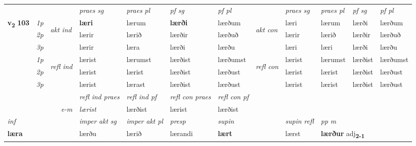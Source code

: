 \begin{longtable}[l]{X>{\footnotesize\itshape}llXXXXlXXXX}
 & &   & \textit{praes sg}  & \textit{praes pl}    & \textit{ pf sg} & \textit{pf pl} & & \textit{praes sg}  & \textit{praes pl}    & \textit{pf sg} & \textit{pf pl }  \\ \cmidrule{4-7} \cmidrule{9-12}
 \multirow{2}{*}{{{\textbf{v{\textsubscript{2}}} \Large{\textbf{103}}}}}  & 1p & \multirow{3}{*}{\begin{turn}{90}\textit{akt ind}\end{turn}} & \textbf{læri} & lærum & \textbf{lærði} & lærðum & \multirow{3}{*}{\begin{turn}{90}\textit{akt con}\end{turn}} &læri & lærum & lærði & lærðum\\*
 & 2p &  &  lærir  & lærið & lærðir & lærðuð & & lærir & lærið & lærðir & lærðuð \\*
 & 3p &  & lærir & læra & lærði & lærðu & & læri & læri& lærði & lærðu \\*
\cmidrule{4-7} \cmidrule{9-12}
 & 1p & \multirow{3}{*}{\begin{turn}{90}\textit{refl ind}\end{turn}}  & lærist & lærumst & lærðist & lærðumst & \multirow{3}{*}{\begin{turn}{90}\textit{refl con}\end{turn}}  &lærist & lærumst & lærðist & lærðumst \\*
 & 2p &  & lærist & lærist & lærðist & lærðust & &lærist & lærist & lærðist & lærðust \\*
 & 3p  & & lærist & lærast & lærðist & lærðust & & lærist & lærist& lærðist & lærðust \\*
\cmidrule{4-7} \cmidrule{9-12}

 & && \textit{refl ind praes} & \textit{refl ind pf} & \textit{refl con praes} & \textit{refl con pf} \\*
\multicolumn{3}{r}{\textit{e-m}}& lærist & lærðist & lærist & lærðist \\*

\cmidrule{4-7}
   {\textit{inf}} & &  & \textit{imper akt sg} & \textit{imper akt pl}   & \textit{presp} & \textit{supin} && \textit{supin refl} & \textit{pp m} \\*
  {\textbf{læra}} & && lærðu  & lærið   & lærandi &  \textbf{lært} && lærst & \multicolumn{2}{l}{\textbf{lærður} adj\textbf{\textsubscript{2-1}}} \\*

\midrule


\end{longtable}
